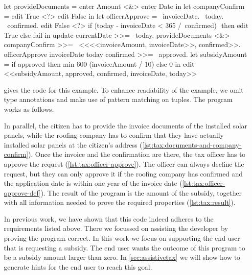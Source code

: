 \begin{TASK}[
    float=ht,
    numbers=right,
    caption={Subsidy request and approval workflow at the Dutch tax office.},
    label=lst:tax]
  let provideDocuments = enter Amount <&> enter Date in
  let companyConfirm = edit True <?> edit False in
  let officerApprove = \ invoiceDate. \ today. \ confirmed.
    edit False <?> if (today - invoiceDate < 365 /\ confirmed) $\label{lst:tax:officer-approve-def}$ then edit True else fail in
  update currentDate >>= \ today.$\label{lst:tax:citizen-info}$
  provideDocuments <&> companyConfirm >>= \ <<<<invoiceAmount, invoiceDate>>, confirmed>>. $\label{lst:tax:documents-and-company-confirm}$
  officerApprove invoiceDate today confirmed >>= \ approved.$\label{lst:tax:officer-approve}$
  let subsidyAmount = if approved then min 600 (invoiceAmount / 10) else 0 in
  edit <<subsidyAmount, approved, confirmed, invoiceDate, today>>$\label{lst:tax:result}$
\end{TASK}

 gives the \TOPHAT code for this example.
To enhance readability of the example,
we omit type annotations and make use of pattern matching on tuples.
The program works as follows.

In parallel, the citizen has to provide the invoice documents of the installed solar panels, while the roofing company has to confirm that they have actually installed solar panels at the citizen's address (\cref{lst:tax:documents-and-company-confirm}).
Once the invoice and the confirmation are there, the tax officer has to approve the request (\cref{lst:tax:officer-approve}).
The officer can always decline the request, but they can only approve it if the roofing company has confirmed and the application date is within one year of the invoice date (\cref{lst:tax:officer-approve-def}).
The result of the program is the amount of the subsidy, together with all information needed to prove the required properties (\cref{lst:tax:result}).

In previous work, we have shown that this code indeed adheres to the requirements listed above.
There we focussed on assisting the developer by proving the program correct.
In this work we focus on supporting the end user that is requesting a subsidy.
The end user wants the outcome of this program to be a subsidy amount larger than zero.
In \cref{sec:assistivetax} we will show how to generate hints for the end user to reach this goal.
